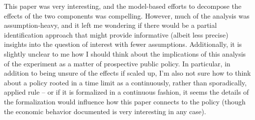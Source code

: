 \documentclass[12pt]{article}
\begin{document}
This paper was very interesting, and the model-based 
efforts to decompose the effects of the two components
was compelling. However, much of the analysis was 
assumption-heavy, and it left me wondering if 
there would be a partial identification approach 
that might provide informative (albeit less 
precise) insights into the question of interest
with fewer assumptions.
Additionally, 
it is slightly unclear to me how 
I should think about the implications of 
this analysis of the experiment as a 
matter of prospective public policy. 
In particular, in addition
to being unsure of the effects 
if scaled up, I'm also not sure 
how to think about a policy rooted 
in a time limit as a continuously,
rather than sporadically, 
applied rule -- or if it is 
formalized in a continuous fashion, it seems 
the details of the formalization would influence 
how this paper connects to the policy (though the 
economic behavior documented is very interesting 
in any case).
\end{document}
